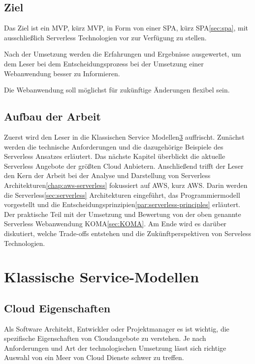 \documentclass[
12pt,
english,
ngerman,
headsepline,
twoside,
openright,
numbers=noenddot,version=first
]{scrreprt}
\begin{document}
\section{Ziel}
\label{sec:task}
Das Ziel ist ein \acrfull{MVP}, kürz \acrshort{MVP}, in Form von einer \acrfull{SPA}, kürz \acrshort{SPA}\ref{sec:spa}, mit ausschließlich Serverless Technologien vor zur Verfügung zu stellen.

Nach der Umsetzung werden die Erfahrungen und Ergebnisse ausgewertet, um dem Leser bei dem Entscheidungsprozess bei der Umsetzung einer Webanwendung besser zu Informieren.

Die Webanwendung soll möglichst für zukünftige Änderungen flexibel sein.

\section{Aufbau der Arbeit}
\label{sec:layout}

Zuerst wird den Leser in die Klassischen Service Modellen\ref{chap:service-models} auffrischt. Zunächst werden die technische Anforderungen und die dazugehörige Beispiele des Serverless Ansatzes erläutert.
Das nächste Kapitel überblickt die aktuelle Serverless Angebote der größten Cloud Anbietern.
Anschließend trifft der Leser den Kern der Arbeit bei der Analyse und Darstellung von Serverless Architekturen\ref{chap:aws-serverless} fokussiert auf \acrfull{AWS}, kurz \acrshort{AWS}. Darin werden die Serverless\ref{sec:serverless} Architekturen eingeführt, das Programmiermodell vorgestellt und die Entscheidungsprinzipien\ref{par:serverless-principles} erläutert.
Der praktische Teil mit der Umsetzung und Bewertung von der oben genannte Serverless Webanwendung KOMA\ref{sec:KOMA}.
Am Ende wird es darüber diskutiert, welche Trade-offs entstehen und die Zukünftperspektiven von Serveless Technologien.


\chapter{Klassische Service-Modellen}
\label{chap:service-models}
\label{chap:principles}
\section{Cloud Eigenschaften}
\label{sec:cloud-char}
Als Software Architekt, Entwickler oder Projektmanager es ist wichtig, die spezifische Eigenschaften von Cloudangebote zu verstehen. Je nach Anforderungen und Art der technologischen Umsetzung lässt sich richtige Auswahl von ein Meer von Cloud Dienste schwer zu treffen. 
\end{document}
